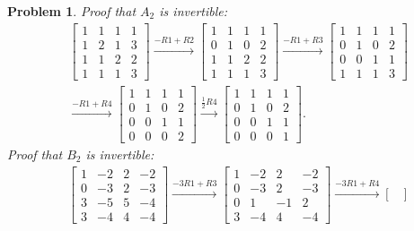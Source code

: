 \documentclass{article}
\theoremstyle{pprop}
\newtheorem{problem}{Problem}[section]
\begin{document}
\begin{problem}
Proof that $A_2$ is invertible:
\begin{align*}
& \begin{bmatrix}
1 & 1 & 1 & 1 \\
1 & 2 & 1 & 3 \\
1 & 1 & 2 & 2 \\
1 & 1 & 1 & 3
\end{bmatrix}
\xrightarrow{-R1+R2}
\begin{bmatrix}
1 & 1 & 1 & 1 \\
0 & 1 & 0 & 2 \\
1 & 1 & 2 & 2 \\
1 & 1 & 1 & 3
\end{bmatrix} 
\xrightarrow{-R1+R3}
\begin{bmatrix}
1 & 1 & 1 & 1 \\
0 & 1 & 0 & 2 \\
0 & 0 & 1 & 1 \\
1 & 1 & 1 & 3
\end{bmatrix} \\
&\xrightarrow{-R1+R4}
\begin{bmatrix}
1 & 1 & 1 & 1 \\
0 & 1 & 0 & 2 \\
0 & 0 & 1 & 1 \\
0 & 0 & 0 & 2
\end{bmatrix} 
\xrightarrow{\frac12R4}
\begin{bmatrix}
1 & 1 & 1 & 1 \\
0 & 1 & 0 & 2 \\
0 & 0 & 1 & 1 \\
0 & 0 & 0 & 1
\end{bmatrix}.
\end{align*}  
Proof that $B_2$ is invertible:
\begin{align*}
  &
\begin{bmatrix}
1 & -2 & 2 & -2 \\
0 & -3 & 2 & -3 \\
3 & -5 & 5 & -4 \\
3 & -4 & 4 & -4
\end{bmatrix}
\xrightarrow{-3R1+R3}
\begin{bmatrix}
1 & -2 & 2 & -2 \\
0 & -3 & 2 & -3 \\
0 & 1 & -1 & 2 \\
3 & -4 & 4 & -4
\end{bmatrix}
\xrightarrow{-3R1+R4}
\begin{bmatrix}

\end{bmatrix}
\end{align*}
\end{problem}
\end{document}
